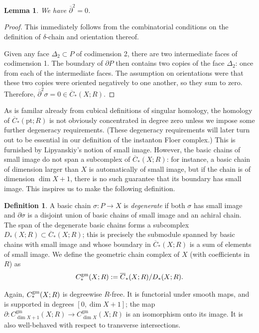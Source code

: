 \documentclass{memo-l}
\newtheorem{lemma}[theorem]{Lemma}
\theoremstyle{definition}
\newtheorem{definition}[theorem]{Definition}
\theoremstyle{remark}
\numberwithin{section}{chapter}
\numberwithin{equation}{chapter}
\begin{document}
\begin{lemma}We have $\overline \partial^2 = 0$.
\end{lemma}

\begin{proof}This immediately follows from the combinatorial conditions on the definition of $\delta$-chain and orientation thereof.

Given any face $\Delta_2 \subset P$ of codimension 2, there are two intermediate faces of codimension 1. The boundary of $\partial P$ then contains two copies of the face $\Delta_2$: once from each of the intermediate faces. The assumption on orientations were that these two copies were oriented negatively to one another, so they sum to zero. Therefore, $\overline\partial^2 \sigma = 0 \in \overline C_*(X;R)$. 
\end{proof}

As is familar already from cubical definitions of singular homology, the homology of $\overline C_*(\text{pt};R)$ is not obviously concentrated in degree zero unless we impose some further degeneracy requirements. (These degeneracy requirements will later turn out to be essential in our definition of the instanton Floer complex.) This is furnished by Lipyanskiy's notion of small image. However, the basic chains of small image do not span a subcomplex of $\overline C_*(X;R)$: for instance, a basic chain of dimension larger than $X$ is automatically of small image, but if the chain is of dimension $\dim X + 1$, there is no such guarantee that its boundary has small image. This inspires us to make the following definition.

\begin{definition}\label{degeneracy}A basic chain $\sigma: P \to X$ is \emph{degenerate} if both $\sigma$ has small image and $\partial \sigma$ is a disjoint union of basic chains of small image and an achiral chain. The span of the degenerate basic chains forms a subcomplex $D_*(X;R) \subset \overline C_*(X;R)$; this is precisely the submodule spanned by basic chains with small image and whose boundary in $\overline C_*(X;R)$ is a sum of elements of small image. We define the geometric chain complex of $X$ (with coefficients in $R$) as $$C_*^{\textup{gm}}(X;R) := \overline C_*(X;R)/D_*(X;R).$$
\end{definition}

Again, $C_*^{\textup{gm}}(X;R)$ is degreewise $R$-free. It is functorial under smooth maps, and is supported in degrees $[0, \dim X + 1]$; the map $\partial: C^{\text{gm}}_{\dim X + 1}(X;R) \to C^{\text{gm}}_{\dim X}(X;R)$ is an isomorphism onto its image. It is also well-behaved with respect to transverse intersections.
\end{document}
